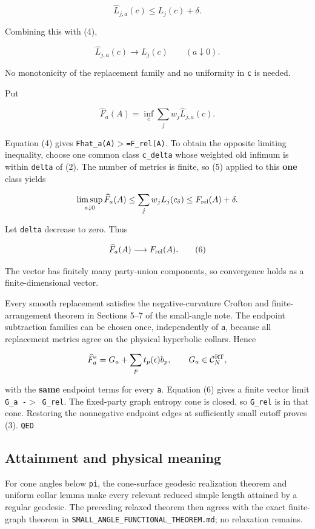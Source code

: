 \documentclass[11pt]{article}
\renewcommand{\textgreater}{\ensuremath{>}}
\begin{document}
\[
\widehat L_{j,a}(c)\le L_j(c)+\delta.
\]

Combining this with (4),

\[
\widehat L_{j,a}(c)\longrightarrow L_j(c)
\qquad(a\downarrow0).
\tag{5}
\]

No monotonicity of the replacement family and no uniformity in
\texttt{c} is needed.

Put

\[
\widehat F_a(A)=\inf_c\sum_jw_j\widehat L_{j,a}(c).
\]

Equation (4) gives \texttt{Fhat\_\allowbreak a(A)\textgreater{}=F\_\allowbreak rel(A)}. To
obtain the opposite limiting inequality, choose one common class
\texttt{c\_\allowbreak delta} whose weighted old infimum is within \texttt{delta} of
(2). The number of metrics is finite, so (5) applied to this
\textbf{one} class yields

\[
\limsup_{a\downarrow0}\widehat F_a(A)
\le\sum_jw_jL_j(c_\delta)
\le F_{\rm rel}(A)+\delta.
\]

Let \texttt{delta} decrease to zero. Thus

\[
\widehat F_a(A)\longrightarrow F_{\rm rel}(A).
\tag{6}
\]

The vector has finitely many party-union components, so convergence
holds as a finite-dimensional vector.

Every smooth replacement satisfies the negative-curvature Crofton and
finite-arrangement theorem in Sections 5--7 of the small-angle note. The
endpoint subtraction families can be chosen once, independently of
\texttt{a}, because all replacement metrics agree on the physical
hyperbolic collars. Hence

\[
\widehat F_a^\epsilon=G_a+\sum_p t_p(\epsilon)b_p,
\qquad G_a\in\mathcal C_N^{\rm RT},
\]

with the \textbf{same} endpoint terms for every \texttt{a}. Equation (6)
gives a finite vector limit \texttt{G\_\allowbreak a\ -\textgreater{}\ G\_\allowbreak rel}. The
fixed-party graph entropy cone is closed, so \texttt{G\_\allowbreak rel} is in that
cone. Restoring the nonnegative endpoint edges at sufficiently small
cutoff proves (3). \texttt{QED}

\subsection{Attainment and physical
meaning}\label{attainment-and-physical-meaning}

For cone angles below \texttt{pi}, the cone-surface geodesic realization
theorem and uniform collar lemma make every relevant reduced simple
length attained by a regular geodesic. The preceding relaxed theorem
then agrees with the exact finite-graph theorem in
\texttt{SMALL\_\allowbreak ANGLE\_\allowbreak FUNCTIONAL\_\allowbreak THEOREM.md}; no relaxation remains.
\end{document}
